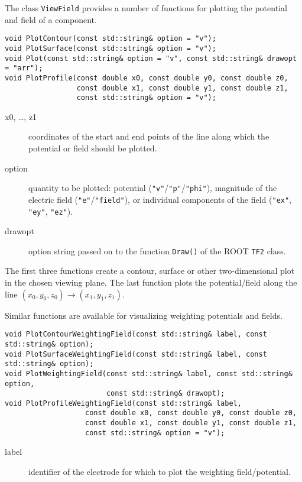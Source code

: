 The class \texttt{ViewField} provides a number of functions 
for plotting the potential and field of a component. 
\begin{lstlisting}
void PlotContour(const std::string& option = "v");
void PlotSurface(const std::string& option = "v");
void Plot(const std::string& option = "v", const std::string& drawopt = "arr");
void PlotProfile(const double x0, const double y0, const double z0,
                 const double x1, const double y1, const double z1,
                 const std::string& option = "v");
\end{lstlisting}
\begin{description}
  \item[x0, \dots, z1]
  coordinates of the start and end points of the line along which 
  the potential or field should be plotted.
  \item[option] 
  quantity to be plotted: potential 
  (\texttt{"v"}/\texttt{"p"}/\texttt{"phi"}), 
  magnitude of the electric field (\texttt{"e"}/\texttt{"field"}), 
  or individual components of the field (\texttt{"ex"}, \texttt{"ey"},
  \texttt{"ez"}).
  \item[drawopt] 
  option string passed on to the function \texttt{Draw()} of the 
  ROOT \texttt{TF2} class. 
\end{description}

The first three functions create a contour, surface or other two-dimensional plot in the chosen viewing plane.
The last function plots the potential/field along the line  
\(\left(x_{0}, y_{0}, z_{0}\right) \rightarrow 
  \left(x_{1}, y_{1}, z_{1}\right)\).

Similar functions are available for visualizing weighting potentials and fields.
\begin{lstlisting}
void PlotContourWeightingField(const std::string& label, const std::string& option);
void PlotSurfaceWeightingField(const std::string& label, const std::string& option);
void PlotWeightingField(const std::string& label, const std::string& option,
                        const std::string& drawopt);
void PlotProfileWeightingField(const std::string& label,
                   const double x0, const double y0, const double z0,
                   const double x1, const double y1, const double z1,
                   const std::string& option = "v");
\end{lstlisting}
\begin{description}
  \item[label] identifier of the electrode for which to plot the weighting field/potential.
\end{description}

